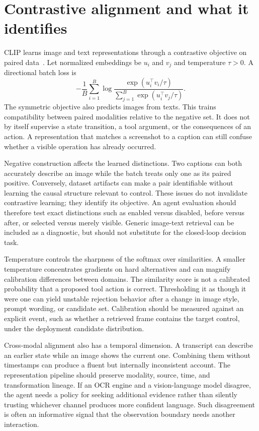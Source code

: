 \section{Contrastive alignment and what it identifies}
\label{sec:C05:contrastive}
CLIP learns image and text representations through a contrastive objective on paired data~\cite{radford2021clip}. Let normalized embeddings be $u_i$ and $v_j$ and temperature $\tau>0$. A directional batch loss is
\begin{equation}
 -\frac1B\sum_{i=1}^{B}\log
 \frac{\exp(u_i^\top v_i/\tau)}
 {\sum_{j=1}^{B}\exp(u_i^\top v_j/\tau)}.
\end{equation}
The symmetric objective also predicts images from texts. This trains compatibility between paired modalities relative to the negative set. It does not by itself supervise a state transition, a tool argument, or the consequences of an action. A representation that matches a screenshot to a caption can still confuse whether a visible operation has already occurred.

Negative construction affects the learned distinctions. Two captions can both accurately describe an image while the batch treats only one as its paired positive. Conversely, dataset artifacts can make a pair identifiable without learning the causal structure relevant to control. These issues do not invalidate contrastive learning; they identify its objective. An agent evaluation should therefore test exact distinctions such as enabled versus disabled, before versus after, or selected versus merely visible. Generic image-text retrieval can be included as a diagnostic, but should not substitute for the closed-loop decision task.

Temperature controls the sharpness of the softmax over similarities. A smaller temperature concentrates gradients on hard alternatives and can magnify calibration differences between domains. The similarity score is not a calibrated probability that a proposed tool action is correct. Thresholding it as though it were one can yield unstable rejection behavior after a change in image style, prompt wording, or candidate set. Calibration should be measured against an explicit event, such as whether a retrieved frame contains the target control, under the deployment candidate distribution.

Cross-modal alignment also has a temporal dimension. A transcript can describe an earlier state while an image shows the current one. Combining them without timestamps can produce a fluent but internally inconsistent account. The representation pipeline should preserve modality, source, time, and transformation lineage. If an OCR engine and a vision-language model disagree, the agent needs a policy for seeking additional evidence rather than silently trusting whichever channel produces more confident language. Such disagreement is often an informative signal that the observation boundary needs another interaction.

